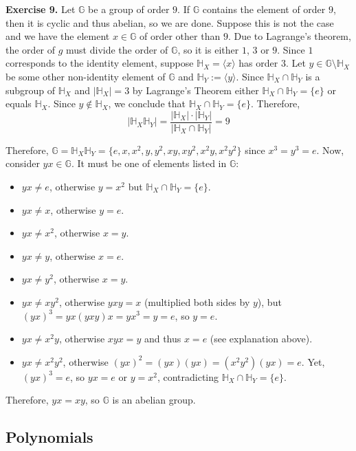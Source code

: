 \documentclass[../lecture-notes-148x210.tex]{subfiles}
\begin{document}
\textbf{Exercise 9.} Let $\mathbb{G}$ be a group of order $9$. If $\mathbb{G}$
contains the element of order $9$, then it is cyclic and thus abelian, so we are
done. Suppose this is not the case and we have the element $x \in \mathbb{G}$ of
order other than $9$. Due to Lagrange's theorem, the order of $g$ must divide
the order of $\mathbb{G}$, so it is either $1$, $3$ or $9$. Since $1$
corresponds to the identity element, suppose $\mathbb{H}_X = \langle x\rangle$
has order $3$. Let $y \in \mathbb{G} \setminus \mathbb{H}_X$ be some other
non-identity element of $\mathbb{G}$ and $\mathbb{H}_Y := \langle y \rangle$.
Since $\mathbb{H}_X \cap \mathbb{H}_Y$ is a subgroup of $\mathbb{H}_X$ and
$|\mathbb{H}_X|=3$ by Lagrange's Theorem either $\mathbb{H}_X \cap
\mathbb{H}_Y=\{e\}$ or equals $\mathbb{H}_X$. Since $y \not\in \mathbb{H}_X$, we
conclude that $\mathbb{H}_X \cap \mathbb{H}_Y=\{e\}$. Therefore,
\begin{equation*}
    |\mathbb{H}_X\mathbb{H}_Y| = \frac{|\mathbb{H}_X|\cdot|\mathbb{H}_Y|}{|\mathbb{H}_X \cap \mathbb{H}_Y|} = 9
\end{equation*}

Therefore, $\mathbb{G} = \mathbb{H}_X\mathbb{H}_Y =
\{e,x,x^2,y,y^2,xy,xy^2,x^2y,x^2y^2\}$ since $x^3=y^3=e$. Now, consider $yx \in
\mathbb{G}$. It must be one of elements listed in $\mathbb{G}$:
\begin{itemize}
    \item $yx \neq e$, otherwise $y=x^2$ but $\mathbb{H}_X \cap \mathbb{H}_Y = \{e\}$.
    \item $yx \neq x$, otherwise $y=e$.
    \item $yx \neq x^2$, otherwise $x=y$.
    \item $yx \neq y$, otherwise $x=e$.
    \item $yx \neq y^2$, otherwise $x=y$.
    \item $yx \neq xy^2$, otherwise $yxy=x$ (multiplied both sides by $y$), but $(yx)^3=yx(yxy)x=yx^3=y=e$, so $y=e$.
    \item $yx \neq x^2y$, otherwise $xyx=y$ and thus $x=e$ (see explanation above).
    \item $yx \neq x^2y^2$, otherwise $(yx)^2=(yx)(yx)=(x^2y^2)(yx) = e$. Yet, $(yx)^3=e$, so $yx=e$ or $y=x^2$, contradicting $\mathbb{H}_X \cap \mathbb{H}_Y = \{e\}$.
\end{itemize} 

Therefore, $yx=xy$, so $\mathbb{G}$ is an abelian group.

\subsection*{Polynomials}
\end{document}
